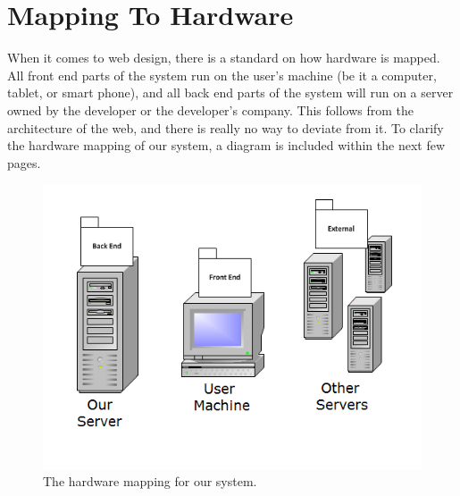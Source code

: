 \section{Mapping To Hardware}
When it comes to web design, there is a standard on how hardware is mapped. All front end parts of the system run on the user's machine (be it a computer, tablet, or smart phone), and all back end parts of the system will run on a server owned by the developer or the developer's company. This follows from the architecture of the web, and there is really no way to deviate from it. To clarify the hardware mapping of our system, a diagram is included within the next few pages.

\begin{figure}[!h]
\centering
\includegraphics{./img/hardware.png}
\caption{The hardware mapping for our system.}
\end{figure}